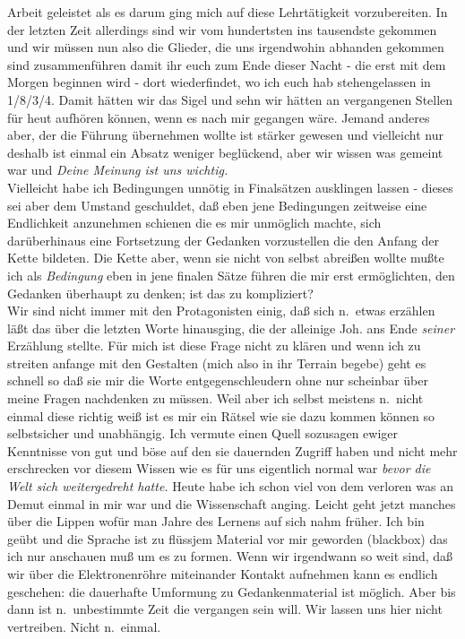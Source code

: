 \documentclass[
]{article}
\begin{document}
Arbeit geleistet als es darum ging mich auf diese Lehrtätigkeit
vorzubereiten. In der letzten Zeit allerdings sind wir vom hundertsten
ins tausendste gekommen und wir müssen nun also die Glieder, die uns
irgendwohin abhanden gekommen sind zusammenführen damit ihr euch zum
Ende dieser Nacht - die erst mit dem Morgen beginnen wird - dort
wiederfindet, wo ich euch hab stehengelassen in 1/8/3/4. Damit hätten
wir das Sigel und sehn wir hätten an vergangenen Stellen für heut
aufhören können, wenn es nach mir gegangen wäre. Jemand anderes aber,
der die Führung übernehmen wollte ist stärker gewesen und vielleicht nur
deshalb ist einmal ein Absatz weniger beglückend, aber wir wissen was
gemeint war und \emph{Deine Meinung ist uns wichtig.}\\
Vielleicht habe ich Bedingungen unnötig in Finalsätzen ausklingen lassen
- dieses sei aber dem Umstand geschuldet, daß eben jene Bedingungen
zeitweise eine Endlichkeit anzunehmen schienen die es mir unmöglich
machte, sich darüberhinaus eine Fortsetzung der Gedanken vorzustellen
die den Anfang der Kette bildeten. Die Kette aber, wenn sie nicht von
selbst abreißen wollte mußte ich als \emph{Bedingung} eben in jene
finalen Sätze führen die mir erst ermöglichten, den Gedanken überhaupt
zu denken; ist das zu kompliziert?\\
Wir sind nicht immer mit den Protagonisten einig, daß sich n.~etwas
erzählen läßt das über die letzten Worte hinausging, die der alleinige
Joh. ans Ende \emph{seiner} Erzählung stellte. Für mich ist diese Frage
nicht zu klären und wenn ich zu streiten anfange mit den Gestalten (mich
also in ihr Terrain begebe) geht es schnell so daß sie mir die Worte
entgegenschleudern ohne nur scheinbar über meine Fragen nachdenken zu
müssen. Weil aber ich selbst meistens n.~nicht einmal diese richtig weiß
ist es mir ein Rätsel wie sie dazu kommen können so selbstsicher und
unabhängig. Ich vermute einen Quell sozusagen ewiger Kenntnisse von gut
und böse auf den sie dauernden Zugriff haben und nicht mehr erschrecken
vor diesem Wissen wie es für uns eigentlich normal war \emph{bevor die
Welt sich weitergedreht hatte.} Heute habe ich schon viel von dem
verloren was an Demut einmal in mir war und die Wissenschaft anging.
Leicht geht jetzt manches über die Lippen wofür man Jahre des Lernens
auf sich nahm früher. Ich bin geübt und die Sprache ist zu flüssjem
Material vor mir geworden (blackbox) das ich nur anschauen muß um es zu
formen. Wenn wir irgendwann so weit sind, daß wir über die
Elektronenröhre miteinander Kontakt aufnehmen kann es endlich geschehen:
die dauerhafte Umformung zu Gedankenmaterial ist möglich. Aber bis dann
ist n.~unbestimmte Zeit die vergangen sein will. Wir lassen uns hier
nicht vertreiben. Nicht n.~einmal.
\end{document}
